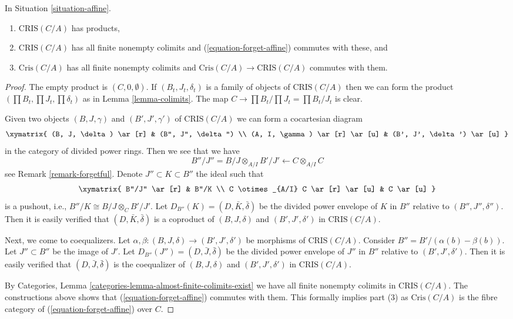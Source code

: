 \begin{lemma}
\label{lemma-affine-thickenings-colimits}
In Situation \ref{situation-affine}.
\begin{enumerate}
\item $\text{CRIS}(C/A)$ has products,
\item $\text{CRIS}(C/A)$ has all finite nonempty colimits and
(\ref{equation-forget-affine}) commutes with these, and
\item $\text{Cris}(C/A)$ has all finite nonempty colimits and
$\text{Cris}(C/A) \to \text{CRIS}(C/A)$ commutes with them.
\end{enumerate}
\end{lemma}

\begin{proof}
The empty product is $(C, 0, \emptyset)$. If $(B_t, J_t, \delta_t)$ is a
family of objects of $\text{CRIS}(C/A)$ then we can form the product
$(\prod B_t, \prod J_t, \prod \delta_t)$ as in Lemma \ref{lemma-colimits}.
The map $C \to \prod B_t/\prod J_t = \prod B_t/J_t$ is clear.

\medskip\noindent
Given two objects $(B, J, \gamma)$ and $(B', J', \gamma')$ of
$\text{CRIS}(C/A)$ we can form a cocartesian diagram
$$
\xymatrix{
(B, J, \delta) \ar[r] & (B'', J'', \delta'') \\
(A, I, \gamma) \ar[r] \ar[u] & (B', J', \delta') \ar[u]
}
$$
in the category of divided power rings. Then we see that we have
$$
B''/J'' = B/J \otimes_{A/I} B'/J' \longleftarrow C \otimes_{A/I} C
$$
see Remark \ref{remark-forgetful}. Denote $J'' \subset K \subset B''$
the ideal such that
$$
\xymatrix{
B''/J'' \ar[r] & B''/K \\
C \otimes_{A/I} C \ar[r] \ar[u] & C \ar[u]
}
$$
is a pushout, i.e., $B''/K \cong B/J \otimes_C B'/J'$.
Let $D_{B''}(K) = (D, \bar K, \bar \delta)$
be the divided power envelope of $K$ in $B''$ relative to
$(B'', J'', \delta'')$. Then it is easily verified that
$(D, \bar K, \bar \delta)$ is a coproduct of $(B, J, \delta)$ and
$(B', J', \delta')$ in $\text{CRIS}(C/A)$.

\medskip\noindent
Next, we come to coequalizers. Let
$\alpha, \beta : (B, J, \delta) \to (B', J', \delta')$ be morphisms of
$\text{CRIS}(C/A)$. Consider $B'' = B'/ (\alpha(b) - \beta(b))$. Let
$J'' \subset B''$ be the image of $J'$. Let
$D_{B''}(J'') = (D, \bar J, \bar\delta)$ be the divided power envelope of
$J''$ in $B''$ relative to $(B', J', \delta')$. Then it is easily verified
that $(D, \bar J, \bar \delta)$ is the coequalizer of $(B, J, \delta)$ and
$(B', J', \delta')$ in $\text{CRIS}(C/A)$.

\medskip\noindent
By Categories, Lemma \ref{categories-lemma-almost-finite-colimits-exist}
we have all finite nonempty colimits in $\text{CRIS}(C/A)$. The constructions
above shows that (\ref{equation-forget-affine}) commutes with them.
This formally implies part (3) as $\text{Cris}(C/A)$ is the fibre category
of (\ref{equation-forget-affine}) over $C$.
\end{proof}

